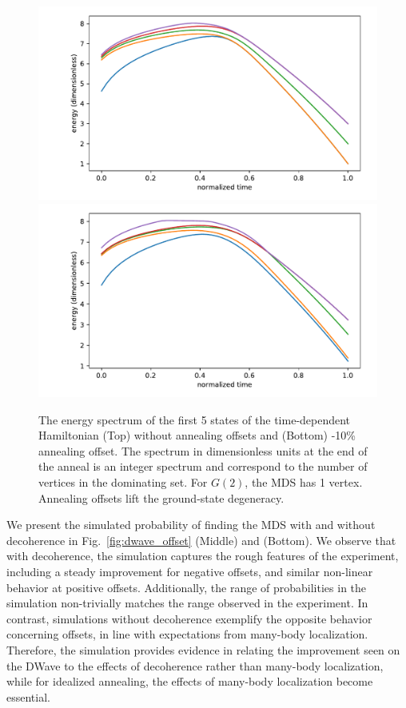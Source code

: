 \documentclass[prd,twocolumn,tightenlines,preprintnumbers,showpacs,superscriptaddress,notitlepage,nofootinbib,eqsecnum,floatfix,longbibliography]{revtex4}
\begin{document}
\begin{figure}
    \centering
    \includegraphics[width=\columnwidth]{./figures/spectrum.pdf}
    \includegraphics[width=\columnwidth]{./figures/spectrum_offset.pdf}
    \caption{The energy spectrum of the first 5 states of the time-dependent Hamiltonian (Top) without annealing offsets and (Bottom) -10\% annealing offset.
The spectrum in dimensionless units at the end of the anneal is an integer spectrum and correspond to the number of vertices in the dominating set.
For $G(2)$, the MDS has 1 vertex.
Annealing offsets lift the ground-state degeneracy.}
    \label{fig:spectrum}
\end{figure}

We present the simulated probability of finding the MDS with and without decoherence in Fig.~\ref{fig:dwave_offset} (Middle) and (Bottom).
We observe that with decoherence, the simulation captures the rough features of the experiment, including a steady improvement for negative offsets, and similar non-linear behavior at positive offsets.
Additionally, the range of probabilities in the simulation non-trivially matches the range observed in the experiment.
In contrast, simulations without decoherence exemplify the opposite behavior concerning offsets, in line with expectations from many-body localization.
Therefore, the simulation provides evidence in relating the improvement seen on the DWave to the effects of decoherence rather than many-body localization, while for idealized annealing, the effects of many-body localization become essential.
\end{document}
